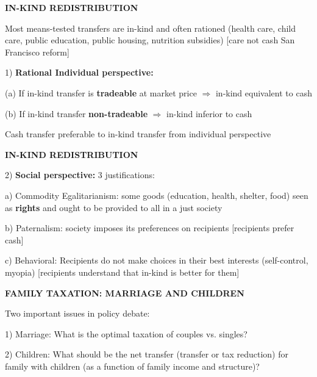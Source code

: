 \documentclass[landscape]{slides}
\begin{document}
\begin{slide}
\begin{center}
{\bf IN-KIND REDISTRIBUTION}
\end{center}
Most means-tested transfers are in-kind and often
rationed (health care, child care, public education, public housing, nutrition
subsidies) [care not cash San Francisco reform]

1) {\bf Rational Individual perspective:}

(a) If in-kind transfer is {\bf tradeable} at market price
$\Rightarrow$ in-kind equivalent to cash

(b) If in-kind transfer {\bf non-tradeable} $\Rightarrow$ in-kind
inferior to cash

Cash transfer preferable to in-kind transfer from individual perspective

\end{slide}

\begin{slide}

\end{slide}



\begin{slide}
\begin{center}
{\bf IN-KIND REDISTRIBUTION}
\end{center}
2) {\bf Social perspective:} 3 justifications:

a) Commodity Egalitarianism: some goods (education, health,
shelter, food) seen as {\bf rights} and ought to be provided to
all in a just society

b) Paternalism: society imposes its preferences on recipients
[recipients prefer cash]

c) Behavioral: Recipients do not make choices in their best
interests (self-control, myopia) [recipients understand that
in-kind is better for them]


\end{slide}


\begin{slide}
\begin{center}
{\bf FAMILY TAXATION: MARRIAGE AND CHILDREN}
\end{center}
Two important issues in policy debate:

1) Marriage: What is the optimal taxation of couples vs. singles?

2) Children: What should be the net transfer (transfer or tax
reduction) for family with children (as a function of family
income and structure)?

\end{slide}
\end{document}
